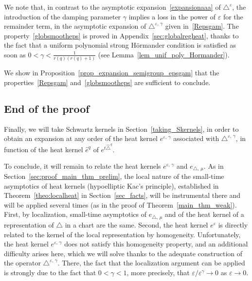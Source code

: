 \documentclass[10pt]{amsart}
\theoremstyle{definition}\newtheorem{defi}[theo]{Definition}\newtheorem{rema}[theo]{Remark}\newtheorem{exam}[theo]{Example}\newtheorem{exem}[theo]{Example}\newtheorem{nota}[theo]{Notation}
\begin{document}
We note that, in contrast to the asymptotic expansion~\eqref{expansionaaa} of $\triangle^\varepsilon$, the introduction of the damping parameter $\gamma$ implies a loss in the power of $\varepsilon$ for the remainder term, in the asymptotic expansion of $\triangle^{\varepsilon,\,\gamma}$ given in~\eqref{Repsgam}. The property~\eqref{globsmootheps} is proved in Appendix~\ref{sec:globalregheat}, thanks to the fact that a uniform polynomial strong H\"ormander condition is satisfied as soon as $0<\gamma<\frac{1}{r(q)(r(q)+1)}$ (see Lemma~\ref{lem_unif_poly_Hormander}).

We show in Proposition~\ref{prop_expansion_semigroup_epsgam} that the properties~\eqref{Repsgam} and~\eqref{globsmootheps} are sufficient to conclude.



\subsection{End of the proof}
Finally, we will take Schwartz kernels in Section~\ref{taking_Skernels}, in order to obtain an expansion at any order of the heat kernel $e^{\varepsilon,\,\gamma}$ associated with $\triangle^{\varepsilon,\,\gamma}$, in function of the heat kernel $\widehat{e}^{q}$ of $e^{t\widehat{\triangle}^{q}}$.

To conclude, it will remain to relate the heat kernels $e^{\varepsilon,\,\gamma}$ and $e_{\triangle,\,\mu}$. As in Section~\ref{sec:proof_main_thm_prelim}, the local nature of the small-time asymptotics of heat kernels (hypoelliptic Kac's principle), established in Theorem~\ref{theo:localheat} in Section~\ref{sec_facts}, will be instrumental there and will be applied several times (as in the proof of Theorem~\ref{main_thm_weak}). First, by localization, small-time asymptotics of $e_{\triangle,\,\mu}$ and of the heat kernel of a representation of $\triangle$ in a chart are the same. Second, the heat kernel $e^\varepsilon$ is directly related to the kernel of the local representation by homogeneity. Unfortunately, the heat kernel $e^{\varepsilon,\,\gamma}$ does not satisfy this homogeneity property, and an additional difficulty arises here, which we will solve thanks to the adequate construction of the operator $\triangle^{\varepsilon,\,\gamma}$. There, the fact that the localization argument can be applied is strongly due to the fact that $0<\gamma<1$, more precisely, that $\varepsilon/\varepsilon^\gamma\rightarrow 0$ as $\varepsilon\rightarrow 0$.
\vspace{2em}
\end{document}

